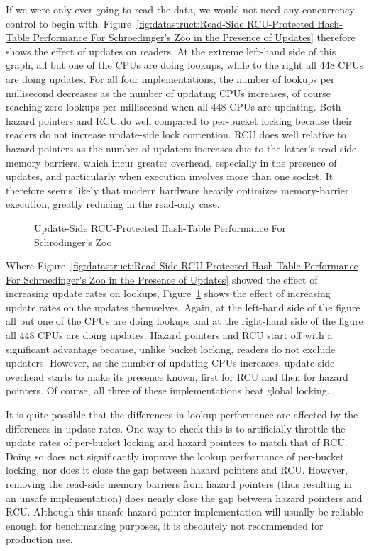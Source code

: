 If we were only ever going to read the data, we would not need any
concurrency control to begin with.
Figure~\ref{fig:datastruct:Read-Side RCU-Protected Hash-Table Performance For Schroedinger's Zoo in the Presence of Updates}
therefore shows the effect of updates on readers.
At the extreme left-hand side of this graph, all but one of the CPUs
are doing lookups, while to the right all 448 CPUs are doing updates.
For all four implementations, the number of lookups per millisecond
decreases as the number of updating CPUs increases, of course reaching
zero lookups per millisecond when all 448 CPUs are updating.
Both hazard pointers and RCU do well compared to per-bucket locking
because their readers do not increase update-side lock contention.
RCU does well relative to hazard pointers as the number of updaters
increases due to the latter's read-side memory barriers, which incur
greater overhead, especially in the presence of updates, and particularly
when execution involves more than one socket.
It therefore seems likely that modern hardware heavily optimizes memory-barrier
execution, greatly reducing  in the read-only case.

\begin{figure}
\centering
{}
\caption{Update-Side RCU-Protected Hash-Table Performance For Schr\"odinger's Zoo}
\label{fig:datastruct:Update-Side RCU-Protected Hash-Table Performance For Schroedinger's Zoo}
\end{figure}

Where
Figure~\ref{fig:datastruct:Read-Side RCU-Protected Hash-Table Performance For Schroedinger's Zoo in the Presence of Updates}
showed the effect of increasing update rates on lookups,
Figure~\ref{fig:datastruct:Update-Side RCU-Protected Hash-Table Performance For Schroedinger's Zoo}
shows the effect of increasing update rates on the updates themselves.
Again, at the left-hand side of the figure all but one of the CPUs are
doing lookups and at the right-hand side of the figure all 448 CPUs are
doing updates.
Hazard pointers and RCU start off with a significant advantage because,
unlike bucket locking, readers do not exclude updaters.
However, as the number of updating CPUs increases, update-side overhead
starts to make its presence known, first for RCU and then for hazard
pointers.
Of course, all three of these implementations beat global locking.

It is quite possible that the differences in lookup performance
are affected by the differences in update rates.
One way to check this is to artificially throttle the update rates of
per-bucket locking and hazard pointers to match that of RCU\@.
Doing so does not significantly improve the lookup performance of
per-bucket locking, nor does it close the gap between hazard pointers
and RCU\@.
However, removing the read-side memory barriers from hazard pointers
(thus resulting in an unsafe implementation) does nearly close the gap
between hazard pointers and RCU\@.
Although this unsafe hazard-pointer implementation will
usually be reliable enough for benchmarking purposes, it is absolutely
not recommended for production use.

